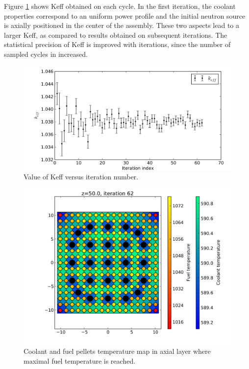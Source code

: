 \documentclass[a4paper,10pt,twocolumn,english]{sphinxsnamc2013}
\begin{document}
Figure \ref{pic:keff} shows Keff obtained on each cycle. In the
first iteration, the coolant properties correspond to an uniform power profile
and the initial neutron source is axially positioned in the center of the
assembly. These two aspects lead to a larger Keff, as compared to results
obtained on subsequent iterations. The statistical precision of Keff is
improved with iterations, since the number of sampled cycles in increased.
\begin{figure}[htbp]
\centering
\capstart

\includegraphics{b_iteration_062_keff.pdf}
\caption{Value of Keff versus iteration number. \label{pic:keff}}\end{figure}
\begin{figure}[htbp]
\centering
\capstart

\includegraphics{b_iteration_062_temp50_0.pdf}
\caption{Coolant and fuel pellets temperature map in axial layer where maximal fuel
temperature is reached. \label{pic:tmap}}\end{figure}
\end{document}
